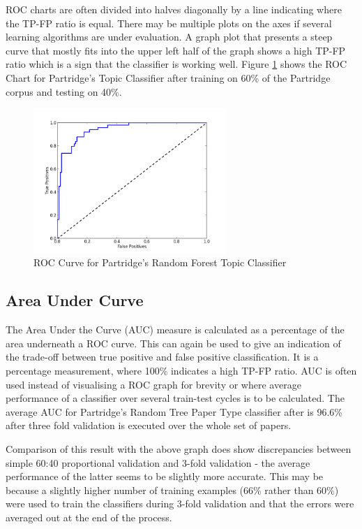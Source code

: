 ROC charts are often divided into halves diagonally by a line indicating where
the TP-FP ratio is equal. There may be multiple plots on the axes if several
learning algorithms are under evaluation. A graph plot that presents a steep
curve that mostly fits into the upper left half of the graph shows a high TP-FP
ratio which is a sign that the classifier is working well.  Figure
\ref{fig:roc_random_forest} shows the ROC Chart for Partridge's Topic
Classifier after training on 60\% of the Partridge corpus and testing on 40\%.

\begin{figure}[!h]
\begin{center}
\includegraphics[width=0.65\textwidth]{images/testing/ROC.png}
\caption{ ROC Curve for Partridge's Random Forest Topic Classifier}
\label{fig:roc_random_forest}
\end{center}
\end{figure}

\subsection{ Area Under Curve }

The Area Under the Curve (AUC) measure is calculated as a percentage of  the
area underneath a ROC curve. This can again be used to give an indication of
the trade-off between true positive and false positive classification. It is a
percentage measurement, where 100\% indicates a high TP-FP ratio. AUC is often
used instead of visualising a ROC graph for brevity or where average
performance of a classifier over several train-test cycles is to be calculated.
The average AUC for Partridge's Random Tree Paper Type classifier after is
96.6\% after three fold validation is executed over the whole set of papers.

Comparison of this result with the above graph does show discrepancies between
simple 60:40 proportional validation and 3-fold validation - the average
performance of the latter seems to be slightly more accurate. This may be
because a slightly higher number of training examples (66\% rather than 60\%)
were used to train the classifiers during 3-fold validation and that the errors
were averaged out at the end of the process.

